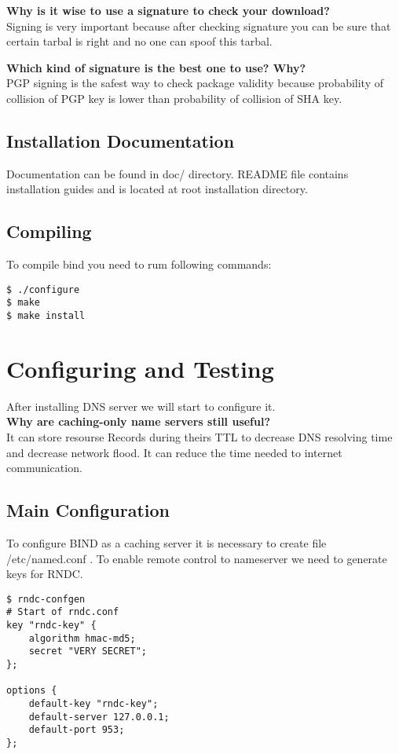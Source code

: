\documentclass[a4paper,11pt]{article}
\theoremstyle{mytheor}
\begin{document}
\textbf{Why is it wise to use a signature to check your download?}\\
Signing is very important because after checking signature you can be sure that certain tarbal is right and no one can spoof this tarbal.

\textbf{Which kind of signature is the best one to use? Why?}\\
PGP signing is the safest way to check package validity because probability of collision of PGP key is lower than probability of collision of SHA key. 

\subsection{Installation Documentation}
Documentation can be found in doc/ directory. README file contains installation guides and is located at root installation directory.

\subsection{Compiling}
To compile bind you need to rum following commands:
\begin{lstlisting}
$ ./configure
$ make
$ make install
\end{lstlisting}

\section{Configuring and Testing}

After installing DNS server we will start to configure it.\\

\textbf{Why are caching-only name servers still useful?}\\
It can store resourse Records during theirs TTL to decrease DNS resolving time and decrease network flood. It can reduce the time needed to internet communication.\\

\subsection{Main Configuration}
To configure BIND as a caching server it is necessary to create file /etc/named.conf . To enable remote control to nameserver we need to generate keys for RNDC.

\begin{lstlisting}
$ rndc-confgen
# Start of rndc.conf
key "rndc-key" {
    algorithm hmac-md5;
    secret "VERY SECRET";
};

options {
    default-key "rndc-key";
    default-server 127.0.0.1;
    default-port 953;
};

\end{lstlisting}
\end{document}
